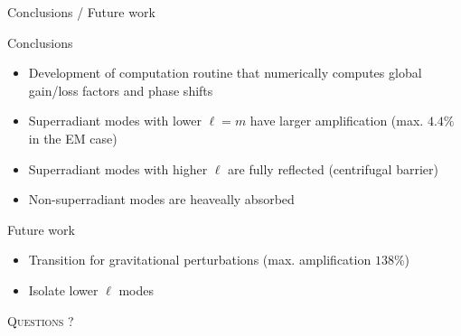 \documentclass[9pt]{beamer}
\begin{document}
\begin{frame}{Conclusions / Future work}
	\begin{block}{Conclusions}
		\begin{itemize}
			\setlength\itemsep{0.8em}
			\item Development of computation routine that numerically computes global gain/loss factors and phase shifts
			\item Superradiant modes with lower $\ell=m$ have larger amplification (max. $4.4\%$ in the EM case)
			\item Superradiant modes with higher $\ell$ are fully reflected (centrifugal barrier)
			\item Non-superradiant modes are heaveally absorbed
		\end{itemize}
	\end{block}
	\begin{block}{Future work}
		\begin{itemize}
			\setlength\itemsep{0.8em}
			\item Transition for gravitational perturbations (max. amplification $138\%$)
			\item Isolate lower $\ell$ modes
		\end{itemize}
	\end{block}
\end{frame}

\begin{frame}[standout]
	\Huge\textsc{Questions ?}
\end{frame}
\end{document}
